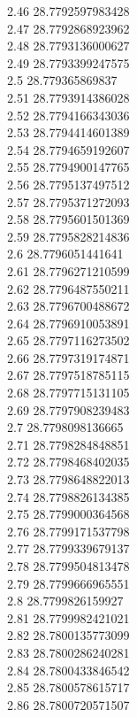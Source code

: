 {2.46	28.7792597983428\\
2.47	28.7792868923962\\
2.48	28.7793136000627\\
2.49	28.7793399247575\\
2.5	28.779365869837\\
2.51	28.7793914386028\\
2.52	28.7794166343036\\
2.53	28.7794414601389\\
2.54	28.7794659192607\\
2.55	28.7794900147765\\
2.56	28.7795137497512\\
2.57	28.7795371272093\\
2.58	28.7795601501369\\
2.59	28.7795828214836\\
2.6	28.7796051441641\\
2.61	28.7796271210599\\
2.62	28.7796487550211\\
2.63	28.7796700488672\\
2.64	28.7796910053891\\
2.65	28.7797116273502\\
2.66	28.7797319174871\\
2.67	28.7797518785115\\
2.68	28.7797715131105\\
2.69	28.7797908239483\\
2.7	28.7798098136665\\
2.71	28.7798284848851\\
2.72	28.7798468402035\\
2.73	28.7798648822013\\
2.74	28.7798826134385\\
2.75	28.7799000364568\\
2.76	28.7799171537798\\
2.77	28.7799339679137\\
2.78	28.7799504813478\\
2.79	28.7799666965551\\
2.8	28.7799826159927\\
2.81	28.7799982421021\\
2.82	28.7800135773099\\
2.83	28.7800286240281\\
2.84	28.7800433846542\\
2.85	28.7800578615717\\
2.86	28.7800720571507\\
}
